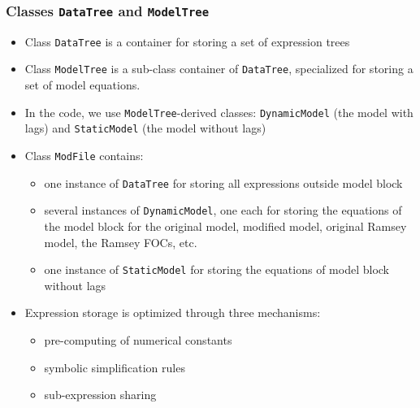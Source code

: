 \documentclass{beamer}
\begin{document}
\begin{frame}
  \frametitle{Classes \texttt{DataTree} and \texttt{ModelTree}}
  \begin{itemize}
  \item Class \texttt{DataTree} is a container for storing a set of expression trees
  \item Class \texttt{ModelTree} is a sub-class container of \texttt{DataTree}, specialized for storing a set of model equations.
  \item In the code, we use \texttt{ModelTree}-derived classes: \texttt{DynamicModel} (the model with lags) and \texttt{StaticModel} (the model without lags)
  \item Class \texttt{ModFile} contains:
    \begin{itemize}
    \item one instance of \texttt{DataTree} for storing all expressions outside model block
    \item several instances of \texttt{DynamicModel}, one each for storing the equations of the model block for the original model, modified model, original Ramsey model, the Ramsey FOCs, etc.
    \item one instance of \texttt{StaticModel} for storing the equations of model block without lags
    \end{itemize}
  \item Expression storage is optimized through three mechanisms:
    \begin{itemize}
    \item pre-computing of numerical constants
    \item symbolic simplification rules
    \item sub-expression sharing
    \end{itemize}
  \end{itemize}
\end{frame}
\end{document}
